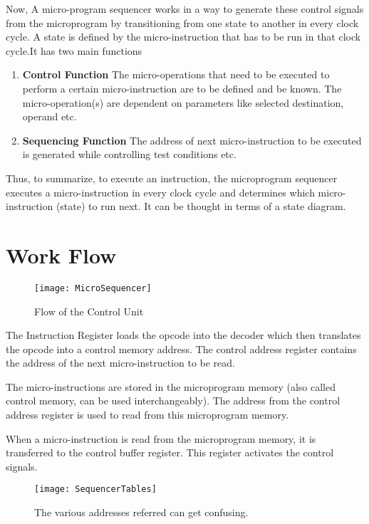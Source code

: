 Now, A micro-program sequencer works in a way to generate these control signals from the microprogram by transitioning from one state to another in every clock cycle. A state is defined by the micro-instruction that has to be run in that clock cycle.It has two main functions 

\begin{enumerate}
    \item \textbf{Control Function} The micro-operations that need to be executed to perform a certain micro-instruction are to be defined and be known. The micro-operation(s) are dependent on parameters like selected destination, operand etc.
    \item \textbf{Sequencing Function} The address of next micro-instruction to be executed is generated while controlling test conditions etc.
\end{enumerate}

Thus, to summarize, to execute an instruction, the microprogram sequencer executes a micro-instruction in every clock cycle and determines which micro-instruction (state) to run next. It can be thought in terms of a state diagram.

\section{Work Flow}

\begin{figure}[h]
    \begin{center}
        \texttt{[image: MicroSequencer]}
    \end{center}
    \caption{Flow of the Control Unit}
\end{figure}

The Instruction Register loads the opcode into the decoder which then translates the opcode into a control memory address. The control address register contains the address of the next micro-instruction to be read.

The micro-instructions are stored in the microprogram memory (also called control memory, can be used interchangeably). The address from the control address register is used to read from this microprogram memory.


When a micro-instruction is read from the microprogram memory, it is transferred to the control buffer register. This register activates the control signals.

\begin{figure}[h]
    \begin{center}
        \texttt{[image: SequencerTables]}
    \end{center}
    \caption{The various addresses referred can get confusing.}
\end{figure}

